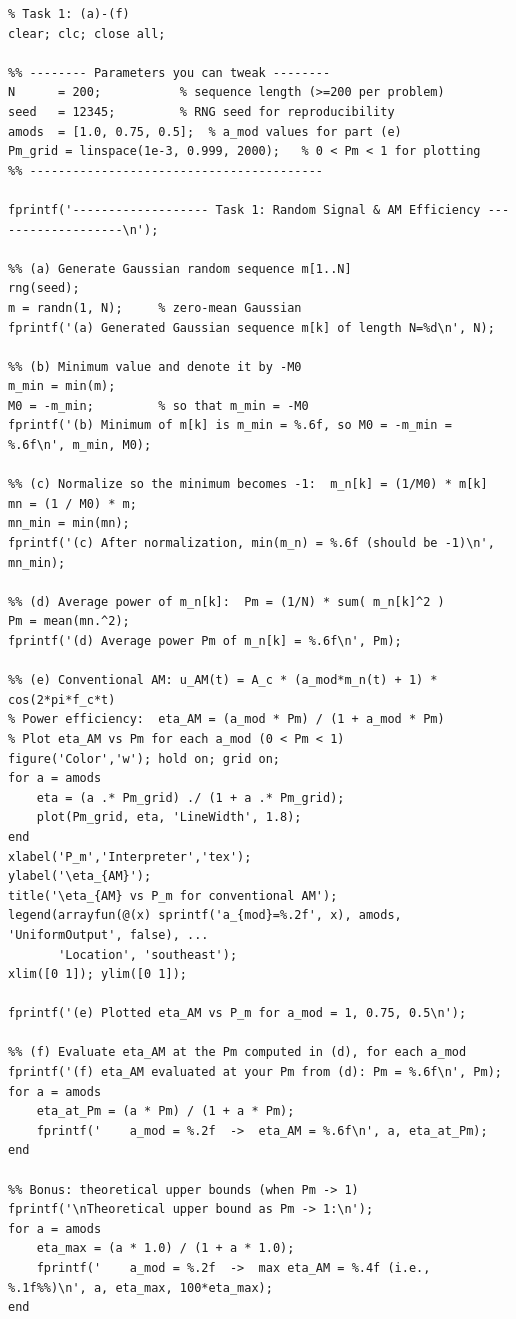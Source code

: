 \documentclass[11pt]{article}
\begin{document}
\begin{lstlisting}[style=mcode,caption={Task 1 MATLAB script.}]
%% AM power/efficiency experiment
% Task 1: (a)-(f)
clear; clc; close all;

%% -------- Parameters you can tweak --------
N      = 200;           % sequence length (>=200 per problem)
seed   = 12345;         % RNG seed for reproducibility
amods  = [1.0, 0.75, 0.5];  % a_mod values for part (e)
Pm_grid = linspace(1e-3, 0.999, 2000);   % 0 < Pm < 1 for plotting
%% -----------------------------------------

fprintf('------------------- Task 1: Random Signal & AM Efficiency -------------------\n');

%% (a) Generate Gaussian random sequence m[1..N]
rng(seed);
m = randn(1, N);     % zero-mean Gaussian
fprintf('(a) Generated Gaussian sequence m[k] of length N=%d\n', N);

%% (b) Minimum value and denote it by -M0
m_min = min(m);
M0 = -m_min;         % so that m_min = -M0
fprintf('(b) Minimum of m[k] is m_min = %.6f, so M0 = -m_min = %.6f\n', m_min, M0);

%% (c) Normalize so the minimum becomes -1:  m_n[k] = (1/M0) * m[k]
mn = (1 / M0) * m;
mn_min = min(mn);
fprintf('(c) After normalization, min(m_n) = %.6f (should be -1)\n', mn_min);

%% (d) Average power of m_n[k]:  Pm = (1/N) * sum( m_n[k]^2 )
Pm = mean(mn.^2);
fprintf('(d) Average power Pm of m_n[k] = %.6f\n', Pm);

%% (e) Conventional AM: u_AM(t) = A_c * (a_mod*m_n(t) + 1) * cos(2*pi*f_c*t)
% Power efficiency:  eta_AM = (a_mod * Pm) / (1 + a_mod * Pm)
% Plot eta_AM vs Pm for each a_mod (0 < Pm < 1)
figure('Color','w'); hold on; grid on;
for a = amods
    eta = (a .* Pm_grid) ./ (1 + a .* Pm_grid);
    plot(Pm_grid, eta, 'LineWidth', 1.8);
end
xlabel('P_m','Interpreter','tex');
ylabel('\eta_{AM}');
title('\eta_{AM} vs P_m for conventional AM');
legend(arrayfun(@(x) sprintf('a_{mod}=%.2f', x), amods, 'UniformOutput', false), ...
       'Location', 'southeast');
xlim([0 1]); ylim([0 1]);

fprintf('(e) Plotted eta_AM vs P_m for a_mod = 1, 0.75, 0.5\n');

%% (f) Evaluate eta_AM at the Pm computed in (d), for each a_mod
fprintf('(f) eta_AM evaluated at your Pm from (d): Pm = %.6f\n', Pm);
for a = amods
    eta_at_Pm = (a * Pm) / (1 + a * Pm);
    fprintf('    a_mod = %.2f  ->  eta_AM = %.6f\n', a, eta_at_Pm);
end

%% Bonus: theoretical upper bounds (when Pm -> 1)
fprintf('\nTheoretical upper bound as Pm -> 1:\n');
for a = amods
    eta_max = (a * 1.0) / (1 + a * 1.0);
    fprintf('    a_mod = %.2f  ->  max eta_AM = %.4f (i.e., %.1f%%)\n', a, eta_max, 100*eta_max);
end
\end{lstlisting}
\end{document}
